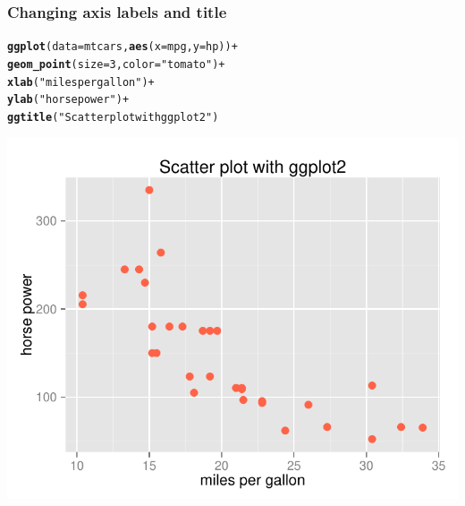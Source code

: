 \documentclass[12pt]{beamer}\usepackage[]{graphicx}\usepackage[]{color}
\makeatletter
\newcommand{\hlnum}[1]{\textcolor[rgb]{0.686,0.059,0.569}{#1}}%
\newcommand{\hlstr}[1]{\textcolor[rgb]{0.192,0.494,0.8}{#1}}%
\newcommand{\hlopt}[1]{\textcolor[rgb]{0,0,0}{#1}}%
\newcommand{\hlstd}[1]{\textcolor[rgb]{0.345,0.345,0.345}{#1}}%
\newcommand{\hlkwc}[1]{\textcolor[rgb]{0.333,0.667,0.333}{#1}}%
\newcommand{\hlkwd}[1]{\textcolor[rgb]{0.737,0.353,0.396}{\textbf{#1}}}%
\newenvironment{kframe}{%
 \def\at@end@of@kframe{}%
 \ifinner\ifhmode%
  \def\at@end@of@kframe{\end{minipage}}%
  \begin{minipage}{\columnwidth}%
 \fi\fi%
 \def\FrameCommand##1{\hskip\@totalleftmargin \hskip-\fboxsep
 \colorbox{shadecolor}{##1}\hskip-\fboxsep
     \hskip-\linewidth \hskip-\@totalleftmargin \hskip\columnwidth}%
 \MakeFramed {\advance\hsize-\width
   \@totalleftmargin\z@ \linewidth\hsize
   \@setminipage}}%
 {\par\unskip\endMakeFramed%
 \at@end@of@kframe}
\newenvironment{knitrout}{}{} %
\makeatother
\begin{document}
\begin{frame}[fragile]
\frametitle{Changing axis labels and title}
\begin{knitrout}\scriptsize
{}\color{fgcolor}\begin{kframe}
\begin{alltt}
\hlkwd{ggplot}\hlstd{(}\hlkwc{data} \hlstd{= mtcars,} \hlkwd{aes}\hlstd{(}\hlkwc{x} \hlstd{= mpg,} \hlkwc{y} \hlstd{= hp))} \hlopt{+}
  \hlkwd{geom_point}\hlstd{(}\hlkwc{size} \hlstd{=} \hlnum{3}\hlstd{,} \hlkwc{color} \hlstd{=} \hlstr{"tomato"}\hlstd{)} \hlopt{+}
  \hlkwd{xlab}\hlstd{(}\hlstr{"miles per gallon"}\hlstd{)} \hlopt{+}
  \hlkwd{ylab}\hlstd{(}\hlstr{"horse power"}\hlstd{)} \hlopt{+}
  \hlkwd{ggtitle}\hlstd{(}\hlstr{"Scatter plot with ggplot2"}\hlstd{)}
\end{alltt}
\end{kframe}

{\centering \includegraphics[width=.6\linewidth,height=.5\linewidth]{figure/xyplot_mtcars5-1} 

}



\end{knitrout}
\end{frame}

\end{document}
